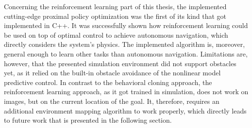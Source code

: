 Concerning the reinforcement learning part of this thesis, the implemented cutting-edge proximal policy optimization was the first of its kind that got implemented in C++. It was successfully shown how reinforcement learning could be used on top of optimal control to achieve autonomous navigation, which directly considers the system's physics. The implemented algorithm is, moreover, general enough to learn other tasks than autonomous navigation. Limitations are, however, that the presented simulation environment did not support obstacles yet, as it relied on the built-in obstacle avoidance of the nonlinear model predictive control. In contrast to the behavioral cloning approach, the reinforcement learning approach, as it got trained in simulation, does not work on images, but on the current location of the goal. It, therefore, requires an additional environment mapping algorithm to work properly, which directly leads to future work that is presented in the following section.
